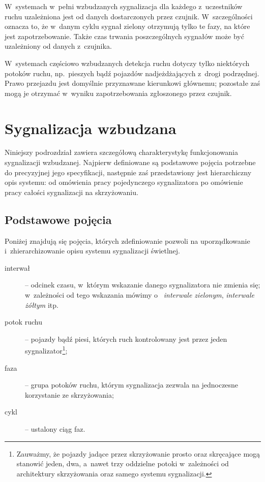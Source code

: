 \documentclass{pracamgr}
\theoremstyle{plain}
\begin{document}
W~systemach w~pełni wzbudzanych sygnalizacja dla każdego z~uczestników
ruchu uzależniona jest od danych dostarczonych przez czujnik.
W~szczególności oznacza to, że w~danym cyklu sygnał zielony otrzymują
tylko te fazy, na które jest zapotrzebowanie. Także czas trwania
poszczególnych sygnałów może być uzależniony od danych z~czujnika.

W~systemach częściowo wzbudzanych detekcja ruchu dotyczy tylko
niektórych potoków ruchu, np.~pieszych bądź pojazdów nadjeżdżających
z~drogi podrzędnej. Prawo przejazdu jest domyślnie przyznawane
kierunkowi głównemu; pozostałe zaś mogą je otrzymać w~wyniku
zapotrzebowania zgłoszonego przez czujnik.

\section{Sygnalizacja wzbudzana}
\label{s:sygn-szczegoly}

Niniejszy podrozdział zawiera szczegółową charakterystykę
funkcjonowania sygnalizacji wzbudzanej. Najpierw definiowane są
podstawowe pojęcia potrzebne do precyzyjnej jego specyfikacji,
następnie zaś przedstawiony jest hierarchiczny opis systemu: od
omówienia pracy pojedynczego sygnalizatora po omówienie pracy całości
sygnalizacji na skrzyżowaniu.

\subsection{Podstawowe pojęcia}
\label{ss:pojecia}

Poniżej znajdują się pojęcia, których zdefiniowanie pozwoli na
uporządkowanie i~zhierarchizowanie opisu systemu sygnalizacji
świetlnej.
\begin{description}
  \item[interwał] -- odcinek czasu, w~którym wskazanie danego
  sygnalizatora nie zmienia się; w~zależności od tego wskazania mówimy
o~  \emph{interwale zielonym}, \emph{interwale żółtym} itp.
  \item[potok ruchu] -- pojazdy bądź piesi, których ruch kontrolowany
  jest przez jeden sygnalizator\footnote{Zauważmy, że pojazdy jadące
    przez skrzyżowanie prosto oraz skręcające mogą stanowić jeden,
    dwa, a~nawet trzy oddzielne potoki w~zależności od architektury
    skrzyżowania oraz samego systemu sygnalizacji.};
  \item[faza] -- grupa potoków ruchu, którym sygnalizacja zezwala na
  jednoczesne korzystanie ze skrzyżowania;
  \item[cykl] -- ustalony ciąg faz.
\end{description}
\end{document}
